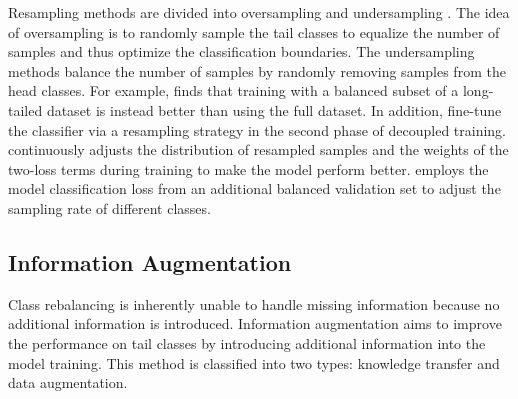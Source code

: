 \documentclass[10pt,twocolumn,letterpaper]{article}
\begin{document}
Resampling methods are divided into oversampling and undersampling \cite{paper69,paper29,paper64}. The idea of oversampling is to randomly sample the tail classes to equalize the number of samples and thus optimize the classification boundaries. The undersampling methods balance the number of samples by randomly removing samples from the head classes. For example, \cite{paper7} finds that training with a balanced subset of a long-tailed dataset is instead better than using the full dataset. In addition, \cite{paper29,paper5} fine-tune the classifier via a resampling strategy in the second phase of decoupled training. \cite{paper70} continuously adjusts the distribution of resampled samples and the weights of the two-loss terms during training to make the model perform better. \cite{paper71} employs the model classification loss from an additional balanced validation set to adjust the sampling rate of different classes.


\subsection*{Information Augmentation}
\label{secA.2}

Class rebalancing is inherently unable to handle missing information because no additional information is introduced. Information augmentation aims to improve the performance on tail classes by introducing additional information into the model training. This method is classified into two types: knowledge transfer and data augmentation.
\end{document}
